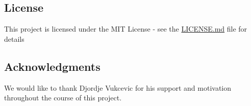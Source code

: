 \subsection*{License}

This project is licensed under the M\+IT License -\/ see the \hyperlink{md_LICENSE}{L\+I\+C\+E\+N\+SE.md} file for details

\subsection*{Acknowledgments}


\begin{DoxyItemize}
\item We would like to thank Djordje Vukcevic for his support and motivation throughout the course of this project. 
\end{DoxyItemize}
